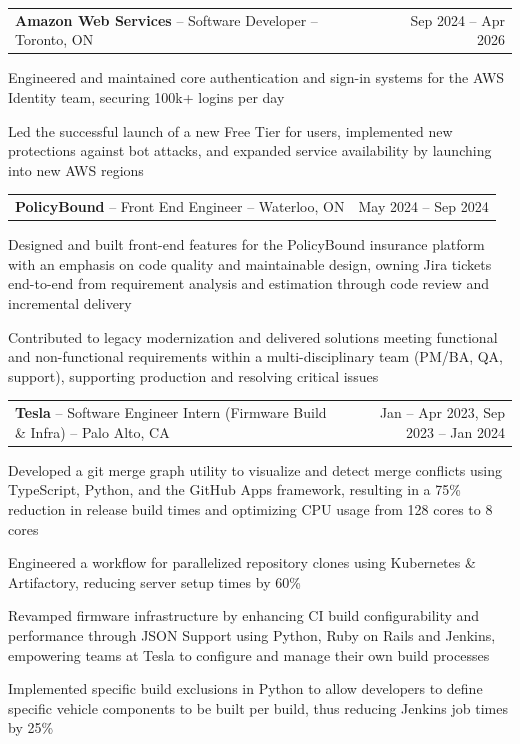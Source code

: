 \documentclass[letterpaper,10pt]{article}
\makeatletter
\newcommand{\entry}[2]{%
  \noindent\begin{tabularx}{\linewidth}{@{}X r@{}}
    #1 & #2 \\
  \end{tabularx}%
}
\makeatother
\begin{document}
\entry{\textbf{Amazon Web Services} -- Software Developer -- Toronto, ON}{Sep 2024 -- Apr 2026}
\begin{tight}
  \item Engineered and maintained core authentication and sign-in systems for the AWS Identity team, securing 100k+ logins per day
  \item Led the successful launch of a new Free Tier for users, implemented new protections against bot attacks, and expanded service availability by launching into new AWS regions
\end{tight}

\entry{\textbf{PolicyBound} -- Front End Engineer -- Waterloo, ON}{May 2024 -- Sep 2024}
\begin{tight}
  \item Designed and built front-end features for the PolicyBound insurance platform with an emphasis on code quality and maintainable design, owning Jira tickets end-to-end from requirement analysis and estimation through code review and incremental delivery
  \item Contributed to legacy modernization and delivered solutions meeting functional and non-functional requirements within a multi-disciplinary team (PM/BA, QA, support), supporting production and resolving critical issues
\end{tight}

\entry{\textbf{Tesla} -- Software Engineer Intern (Firmware Build \& Infra) -- Palo Alto, CA}{Jan -- Apr 2023, Sep 2023 -- Jan 2024}
\begin{tight}
  \item Developed a git merge graph utility to visualize and detect merge conflicts using TypeScript, Python, and the GitHub Apps framework, resulting in a 75\% reduction in release build times and optimizing CPU usage from 128 cores to 8 cores
  \item Engineered a workflow for parallelized repository clones using Kubernetes \& Artifactory, reducing server setup times by 60\%
  \item Revamped firmware infrastructure by enhancing CI build configurability and performance through JSON Support using Python, Ruby on Rails and Jenkins, empowering teams at Tesla to configure and manage their own build processes
  \item Implemented specific build exclusions in Python to allow developers to define specific vehicle components to be built per build, thus reducing Jenkins job times by 25\%
\end{tight}
\end{document}

